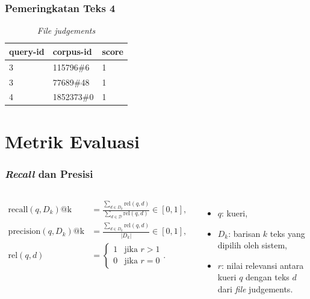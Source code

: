 \documentclass[10pt]{beamer}
\newcommand{\f}[1]{\textit{#1}}
\begin{document}
\begin{frame}
\frametitle{Pemeringkatan Teks 4}

    \begin{table}[!ht]
        \centering
        \caption{\f{File judgements}}
        \label{tab:judgements-file-example}
        \begin{tabular}{|l|l|l|}
            \hline
            \textbf{query-id} & \textbf{corpus-id} & \textbf{score} \\ \hline
            3                 & 115796\#6          & 1              \\ \hline
            3                 & 77689\#48          & 1              \\ \hline
            4                 & 1852373\#0         & 1              \\ \hline
        \end{tabular}
    \end{table}
\end{frame}

\section{Metrik Evaluasi}

\begin{frame}
    \frametitle{\f{Recall} dan Presisi}

    \begin{columns}
        \begin{align*}
            \text{recall}(q, D_k)\text{@k} &= \frac{\sum_{d \in D_k} \text{rel}(q, d)}{\sum_{d \in \mathcal{D}} \text{rel}(q, d)} \in [0, 1], \\ 
            \text{precision}(q, D_k)\text{@k} &= \frac{\sum_{d \in D_k} \text{rel}(q, d)}{|D_k|} \in [0, 1], \\
            \text{rel}(q, d) &= \begin{cases} 
            1 & \text{jika } r > 1 \\
            0 & \text{jika } r = 0
            \end{cases}.
        \end{align*}

        \begin{itemize}
            \item $q$: kueri,
            \item $D_k$: barisan $k$ teks yang dipilih oleh sistem,
            \item $r$: nilai relevansi antara kueri $q$ dengan teks $d$ dari \f{file} judgements.
        \end{itemize}
    \end{columns}
\end{frame}
\end{document}
